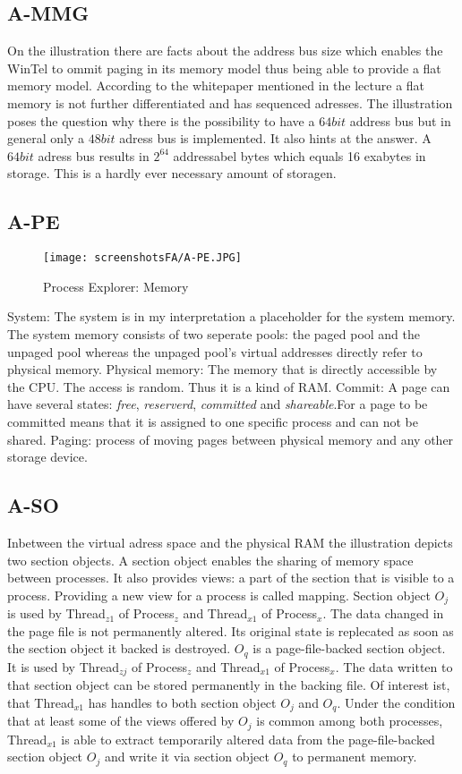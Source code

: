 \documentclass{Gharaei}
\begin{document}
\subsection{A-MMG}
On the illustration there are facts about the address bus size which enables the  WinTel to ommit paging in its memory model thus being able to provide a flat memory model. According to the whitepaper mentioned in the lecture a flat memory is not further differentiated and has sequenced adresses. The illustration poses the question why there is the possibility to have a $64bit$ address bus but in general only a $48bit$ adress bus is implemented. It also hints at the answer. A $64bit$ adress bus results in $2^{64}$ addressabel bytes which equals 16 exabytes in storage. This is a hardly ever necessary amount of storagen. %
\subsection{A-PE}
\par
\begin{wrapfigure}{r}{0pt} 
    
    \texttt{[image: screenshotsFA/A-PE.JPG]} 
    \caption{Process Explorer: Memory}
 
\end{wrapfigure}
System: The system is in my interpretation a placeholder for the system memory. The system memory consists of two seperate pools: the paged pool and the unpaged pool whereas the unpaged pool's virtual addresses directly refer to physical memory.
Physical memory: The memory that is directly accessible by the CPU. The access is random. Thus it is a kind of RAM.
Commit: A page can have several states: \textit{free}, \textit{reserverd}, \textit{committed} and \textit{shareable}.For a page to be committed means that it is assigned to one specific process and can not be shared.
Paging: process of moving pages between physical memory and any other storage device.
\subsection{A-SO}
Inbetween the virtual adress space and the physical RAM the illustration depicts two section objects. A section object enables the sharing of memory space between processes. It also provides views: a part of the section that is visible to a process. Providing a new view for a process is called mapping. Section object $O_{j}$ is used by Thread$_{z1}$ of Process$_{z}$ and Thread$_{x1}$ of Process$_{x}$. The data changed in the page file is not permanently altered. Its original state is replecated as soon as the section object it backed is destroyed. $O_q$ is a page-file-backed section object. It is used by Thread$_{zj}$ of Process$_{z}$ and Thread$_{x1}$ of Process$_{x}$. The data written to that section object can be stored permanently in the backing file. Of interest ist, that Thread$_{x1}$ has handles to both section object $O_j$ and $O_q$. Under the condition that at least some of the views offered by $O_j$ is common among both processes, Thread$_{x1}$ is able to extract temporarily altered data from the page-file-backed section object $O_j$ and write it via section object $O_q$ to permanent memory. 
\end{document}
